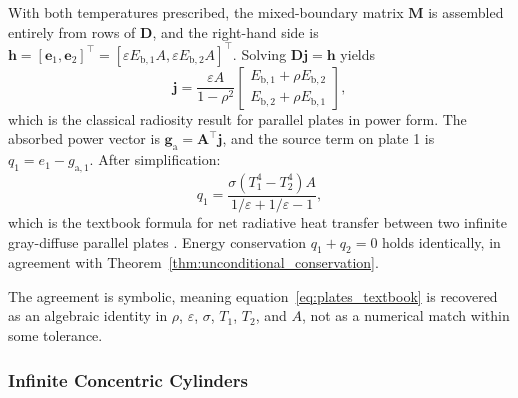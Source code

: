 \documentclass[preprint,1p,times]{elsarticle}
\theoremstyle{plain}
\theoremstyle{definition}
\theoremstyle{remark}
\begin{document}
With both temperatures prescribed, the mixed-boundary matrix $\mathbf{M}$ is assembled entirely from rows of $\mathbf{D}$, and the right-hand side is $\mathbf{h} = [\mathbf{e}_1, \mathbf{e}_2]^\top = [\varepsilon E_{\mathrm{b},1} A, \varepsilon E_{\mathrm{b},2} A]^\top$. Solving $\mathbf{D}\mathbf{j} = \mathbf{h}$ yields
\begin{equation}
\mathbf{j} = \frac{\varepsilon A}{1-\rho^2} \begin{bmatrix} E_{\mathrm{b},1} + \rho E_{\mathrm{b},2} \\ E_{\mathrm{b},2} + \rho E_{\mathrm{b},1} \end{bmatrix},
\end{equation}
which is the classical radiosity result for parallel plates in power form. The absorbed power vector is $\mathbf{g}_\mathrm{a} = \mathbf{A}^\top \mathbf{j}$, and the source term on plate 1 is $q_1 = e_1 - g_\mathrm{a,1}$. After simplification:
\begin{equation}
q_1 = \frac{\sigma(T_1^4 - T_2^4) A}{1/\varepsilon + 1/\varepsilon - 1},
\label{eq:plates_textbook}
\end{equation}
which is the textbook formula for net radiative heat transfer between two infinite gray-diffuse parallel plates \citep{Daun2021}. Energy conservation $q_1 + q_2 = 0$ holds identically, in agreement with Theorem~\ref{thm:unconditional_conservation}.

The agreement is symbolic, meaning equation~\eqref{eq:plates_textbook} is recovered as an algebraic identity in $\rho$, $\varepsilon$, $\sigma$, $T_1$, $T_2$, and $A$, not as a numerical match within some tolerance.

\subsubsection{Infinite Concentric Cylinders}
\label{sec:symbolic_cylinders}
\end{document}
